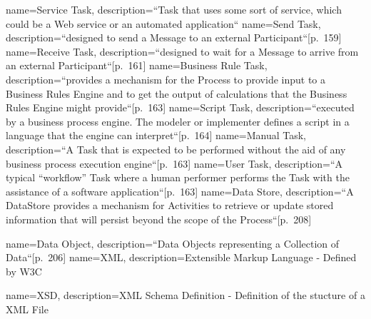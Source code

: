 {
	name={Service Task},
	description={``Task that uses some sort of service, which could be a Web service or an automated application``\cite[p.~158]{bpmnstandard} }
}
{
	name={Send Task},
	description={``designed to send a Message to an external Participant``[p.~159]\cite{bpmnstandard} }
}
{
	name={Receive Task},
	description={``designed to wait for a Message to arrive from an external Participant``[p.~161]\cite{bpmnstandard} }
}
{
	name={Business Rule Task},
	description={``provides a mechanism for the Process to provide input to a Business Rules Engine and to get the output of calculations that the Business Rules Engine might provide``[p.~163]\cite{bpmnstandard} }
}
{
	name={Script Task},
	description={``executed by a business process engine. The modeler or implementer defines a script in a language that the engine can interpret``[p.~164]\cite{bpmnstandard} }
}
{
	name={Manual Task},
	description={``A Task that is expected to be performed without the aid of any business process execution engine``[p.~163]\cite{bpmnstandard} }
}
{
	name={User Task},
	description={``A typical “workflow” Task where a human performer performs the Task with the assistance of a software application``[p.~163]\cite{bpmnstandard} }
}
{
	name={Data Store},
	description={``A DataStore provides a mechanism for Activities to retrieve or update stored information that will persist beyond the
		scope of the Process``[p.~208]\cite{bpmnstandard} }
}

{
	name={Data Object},
	description={``Data Objects representing a Collection of Data``[p.~206]\cite{bpmnstandard} }
}
{
	name={XML},
	description={Extensible Markup Language - Defined by W3C\cite{bray1997extensibl} }
}

{
	name={XSD},
	description={XML Schema Definition - Definition of the stucture of a XML File\cite{bray1997extensibl} }
}